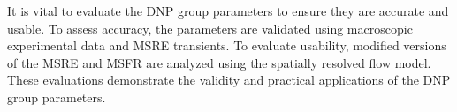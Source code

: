 It is vital to evaluate the \gls{DNP} group parameters to ensure they are accurate and usable.
To assess accuracy, the parameters are validated using macroscopic experimental data and \gls{MSRE} transients.
To evaluate usability, modified versions of the \gls{MSRE} and \gls{MSFR} are analyzed using the spatially resolved flow model.
These evaluations demonstrate the validity and practical applications of the \gls{DNP} group parameters.